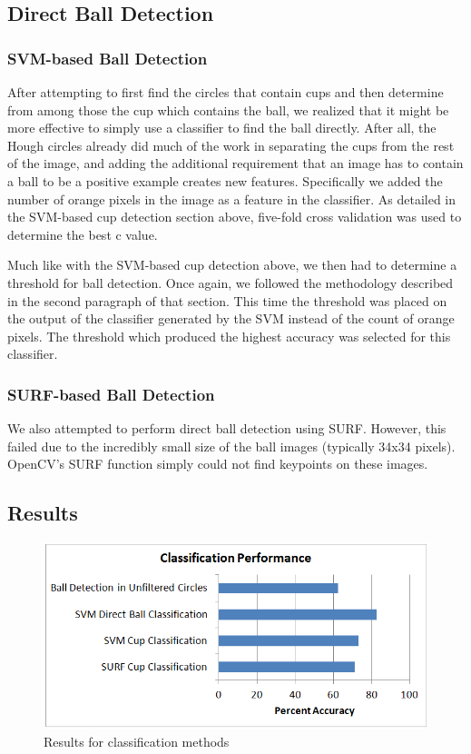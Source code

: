 \documentclass[letterpaper, 10 pt, conference]{ieeeconf}  %
\begin{document}
\subsection{Direct Ball Detection}

\subsubsection{SVM-based Ball Detection}

After attempting to first find the circles that contain cups and then determine from among those the cup which contains the ball, we realized that it might be more effective to simply use a classifier to find the ball directly. After all, the Hough circles already did much of the work in separating the cups from the rest of the image, and adding the additional requirement that an image has to contain a ball to be a positive example creates new features.  Specifically we added the number of orange pixels in the image as a feature in the classifier.  As detailed in the SVM-based cup detection section above, five-fold cross validation was used to determine the best c value.

Much like with the SVM-based cup detection above, we then had to determine a threshold for ball detection.  Once again, we followed the methodology described in the second paragraph of that section.  This time the threshold was placed on the output of the classifier generated by the SVM instead of the count of orange pixels.  The threshold which produced the highest accuracy was selected for this classifier.

\subsubsection{SURF-based Ball Detection}

We also attempted to perform direct ball detection using SURF.  However, this failed due to the incredibly small size of the ball images (typically 34x34 pixels).  OpenCV's SURF function simply could not find keypoints on these images.

\subsection{Results}



\begin{figure}[thpb]
      \centering
	  \includegraphics[scale =0.45]{performance}
      \caption{Results for classification methods}
      \label{fig:results}
\end{figure}
\end{document}
